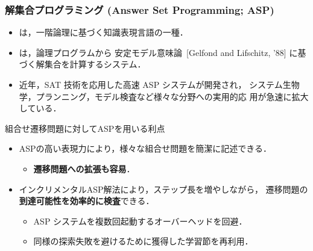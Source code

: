 \documentclass[dvipdfmx,11pt]{beamer}
\begin{document}
\begin{frame}
  \frametitle{解集合プログラミング {\large(Answer Set Programming; ASP)}}
  \begin{itemize}
  \item {}は，一階論理に基づく知識表現言語の一種．
  \item {}は，論理プログラムから
    安定モデル意味論~{\scriptsize[Gelfond and Lifschitz, '88]}
    に基づく解集合を計算するシステム．
  \item 近年，SAT 技術を応用した高速 ASP システムが開発され，
    システム生物学，プランニング，モデル検査など様々な分野への実用的応
    用が急速に拡大している．
  \end{itemize}

  \begin{alertblock}{組合せ遷移問題に対してASPを用いる利点}
    \begin{itemize}
    \item ASPの高い表現力により，様々な組合せ問題を簡潔に記述できる．
      \begin{itemize}
      \item \alert{\bf 遷移問題への拡張も容易}．
      \end{itemize}
    \item インクリメンタルASP解法により，ステップ長を増やしながら，
      遷移問題の\alert{\bf 到達可能性を効率的に検査}できる．
      \begin{itemize}
      \item ASP システムを複数回起動するオーバーヘッドを回避．
      \item 同様の探索失敗を避けるために獲得した学習節を再利用．
      \end{itemize}
    \end{itemize}
  \end{alertblock}
\end{frame}
\end{document}
